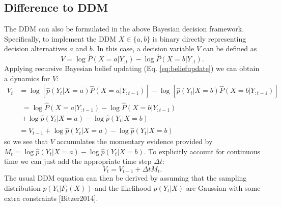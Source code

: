 \documentclass[10pt,a4paper]{article}
\begin{document}
\subsection{Difference to DDM}
The DDM can also be formulated in the above Bayesian decision framework. Specifically, to implement the DDM $X \in \{a, b\}$ is binary directly representing decision alternatives $a$ and $b$. In this case, a decision variable $V$ can be defined as
\begin{equation}
V = \log\hat{P}(X=a | Y_{:t}) - \log\hat{P}(X=b | Y_{:t}).
\end{equation}
Applying recursive Bayesian belief updating (Eq. \ref{eq:beliefupdate}) we can obtain a dynamics for $V$:
\begin{align}
V_t &= \log\left[\hat{p}(Y_t | X=a) \hat{P}(X=a | Y_{:t-1})\right] - \log\left[\hat{p}(Y_t | X=b) \hat{P}(X=b | Y_{:t-1})\right]\\
& \begin{aligned}=\log\hat{P}(X=a | Y_{:t-1}) - \log\hat{P}(X=b | Y_{:t-1})\\ + \log\hat{p}(Y_t | X=a) - \log\hat{p}(Y_t | X=b)\end{aligned}\\
&= V_{t-1} + \log\hat{p}(Y_t | X=a) - \log\hat{p}(Y_t | X=b)
\end{align}
so we see that $V$ accumulates the momentary evidence provided by $M_t = \log\hat{p}(Y_t | X=a) - \log\hat{p}(Y_t | X=b)$. To explicitly account for continuous time we can just add the appropriate time step $\Delta t$:
\begin{equation}
V_t = V_{t-1} + \Delta t M_t.
\end{equation}
The usual DDM equation can then be derived by assuming that the sampling distribution $p(Y_t | F_t(X))$ and the likelihood $\hat{p}(Y_t | X)$ are Gaussian with some extra constraints [Bitzer2014].
\end{document}
